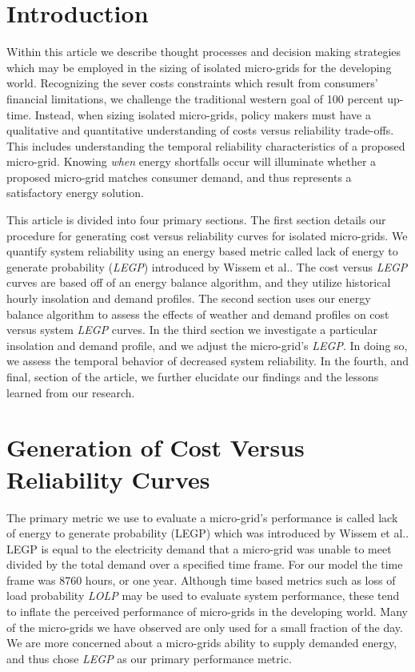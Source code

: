 \documentclass{article}
\begin{document}
\begin{abstract}

\end{abstract}

\section{Introduction}

Within this article we describe thought processes and decision making strategies which may be employed in the sizing of isolated micro-grids for the developing world. 
Recognizing the sever costs constraints which result from consumers' financial limitations, we challenge the traditional western goal of 100 percent up-time. 
Instead, when sizing isolated micro-grids, policy makers must have a qualitative and quantitative understanding of costs versus reliability trade-offs.
This includes understanding the temporal reliability characteristics of a proposed micro-grid.
Knowing \emph{when} energy shortfalls occur will illuminate whether a proposed micro-grid matches consumer demand, and thus represents a satisfactory energy solution.  

This article is divided into four primary sections.
The first section details our procedure for generating cost versus reliability curves for isolated micro-grids. We quantify system reliability using an energy based metric called lack of energy to generate probability (\emph{LEGP}) introduced by Wissem et al.\cite{}. 
The cost versus \emph{LEGP} curves are based off of an energy balance algorithm, and they utilize historical hourly insolation and demand profiles.
The second section uses our energy balance algorithm to assess the effects of weather and demand profiles on cost versus system \emph{LEGP} curves.  
In the third section we investigate a particular insolation and demand profile, and we adjust the micro-grid's \emph{LEGP}.
In doing so, we assess the temporal behavior of decreased system reliability. 
In the fourth, and final, section of the article, we further elucidate our findings and the lessons learned from our research. 

\section{Generation of Cost Versus Reliability Curves}
The primary metric we use to evaluate a micro-grid's performance is called lack of energy to generate probability (LEGP) which was introduced by Wissem et al.\cite{}.
LEGP is equal to the electricity demand that a micro-grid was unable to meet divided by the total demand over a specified time frame. 
For our model the time frame was 8760 hours, or one year. 
Although time based metrics such as loss of load probability \emph{LOLP} may be used to evaluate system performance, these tend to inflate the perceived performance of micro-grids in the developing world.  
Many of the micro-grids we have observed are only used for a small fraction of the day.
We are more concerned about a micro-grids ability to supply demanded energy, and thus chose \emph{LEGP} as our primary performance metric. 
\end{document}
